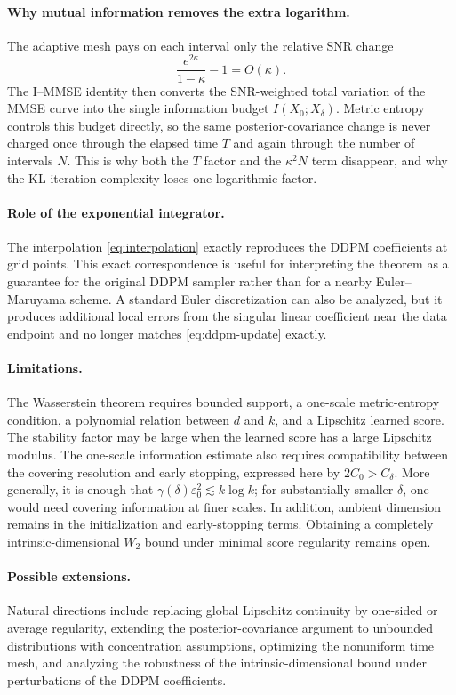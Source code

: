 \documentclass[11pt]{article}
\theoremstyle{definition}
\begin{document}
\paragraph{Why mutual information removes the extra logarithm.}
The adaptive mesh pays on each interval only the relative SNR change
\[
    \frac{e^{2\kappa}}{1-\kappa}-1=O(\kappa).
\]
The I--MMSE identity then
converts the SNR-weighted total variation of the MMSE curve into the
single information budget $I(X_0;X_\delta)$. Metric entropy controls
this budget directly, so the same posterior-covariance change is never
charged once through the elapsed time $T$ and again through the number
of intervals $N$. This is why both the $T$ factor and the
$\kappa^2N$ term disappear, and why the KL iteration complexity loses
one logarithmic factor.

\paragraph{Role of the exponential integrator.}
The interpolation \eqref{eq:interpolation} exactly reproduces the DDPM coefficients at grid points. This exact correspondence is useful for interpreting the theorem as a guarantee for the original DDPM sampler rather than for a nearby Euler--Maruyama scheme. A standard Euler discretization can also be analyzed, but it produces additional local errors from the singular linear coefficient near the data endpoint and no longer matches \eqref{eq:ddpm-update} exactly.

\paragraph{Limitations.}
The Wasserstein theorem requires bounded support, a one-scale
metric-entropy condition, a polynomial relation between $d$ and $k$,
and a Lipschitz learned score. The stability factor may be large when
the learned score has a large Lipschitz modulus. The one-scale
information estimate also requires compatibility between the covering
resolution and early stopping, expressed here by
$2C_0>C_\delta$. More generally, it is enough that
$\gamma(\delta)\varepsilon_0^2\lesssim k\log k$; for substantially
smaller $\delta$, one would need covering information at finer scales.
In addition, ambient dimension remains in the initialization and
early-stopping terms. Obtaining a completely intrinsic-dimensional
$W_2$ bound under minimal score regularity remains open.

\paragraph{Possible extensions.}
Natural directions include replacing global Lipschitz continuity by one-sided or average regularity, extending the posterior-covariance argument to unbounded distributions with concentration assumptions, optimizing the nonuniform time mesh, and analyzing the robustness of the intrinsic-dimensional bound under perturbations of the DDPM coefficients.
\end{document}
